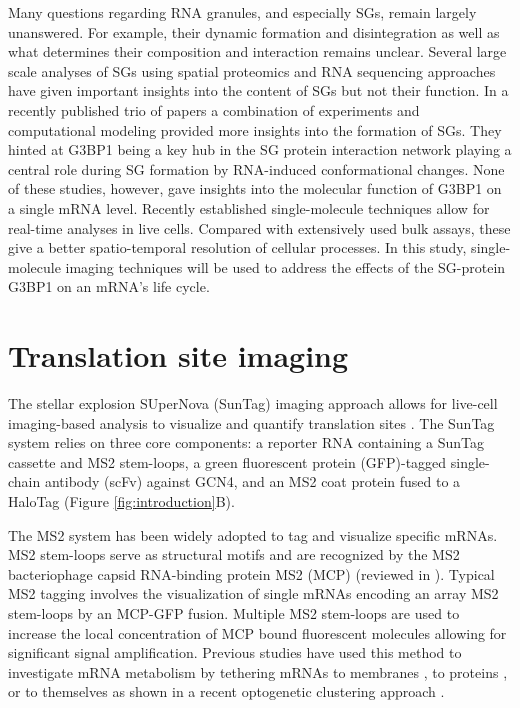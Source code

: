 Many questions regarding RNA granules, and especially SGs, remain largely unanswered.
For example, their dynamic formation and disintegration as well as what determines their composition and interaction remains unclear.
Several large scale analyses of SGs using spatial proteomics \cite{markmiller_context-dependent_2018, jain_atpase-modulated_2016, youn_high-density_2018} and RNA sequencing \cite{khong_isolation_2018} approaches have given important insights into the content of SGs but not their function.
In a recently published trio of papers \cite{guillen-boixet_rna-induced_2020, sanders_competing_2020, yang_g3bp1_2020} a combination of experiments and computational modeling provided more insights into the formation of SGs.
They hinted at G3BP1 being a key hub in the SG protein interaction network playing a central role during SG formation by RNA-induced conformational changes.
None of these studies, however, gave insights into the molecular function of G3BP1 on a single mRNA level.
Recently established single-molecule techniques allow for real-time analyses in live cells.
Compared with extensively used bulk assays, these give a better spatio-temporal resolution of cellular processes.
In this study, single-molecule imaging techniques will be used to address the effects of the SG-protein G3BP1 on an mRNA's life cycle.

    
\section{Translation site imaging} \label{translation_site_imaging}

The stellar explosion SUperNova (SunTag) imaging approach allows for live-cell imaging-based analysis to visualize and quantify translation sites \cite{tanenbaum_protein-tagging_2014}.
The SunTag system relies on three core components: a reporter RNA containing a SunTag cassette and MS2 stem-loops, a green fluorescent protein (GFP)-tagged single-chain antibody (scFv) against GCN4, and an MS2 coat protein fused to a HaloTag (Figure \ref{fig:introduction}B).

The MS2 system has been widely adopted to tag and visualize specific mRNAs.
MS2 stem-loops serve as structural motifs and are recognized by the MS2 bacteriophage capsid RNA-binding protein MS2 (MCP) (reviewed in \cite{george_intracellular_2018}).
Typical MS2 tagging involves the visualization of single mRNAs encoding an array MS2 stem-loops by an MCP-GFP fusion.
Multiple MS2 stem-loops are used to increase the local concentration of MCP bound fluorescent molecules allowing for significant signal amplification.
Previous studies have used this method to investigate mRNA metabolism by tethering mRNAs to membranes \cite{genz_association_2013}, to proteins \cite{bos_tethered_2016}, or to themselves as shown in a recent optogenetic clustering approach \cite{kim_optogenetic_2020}.

